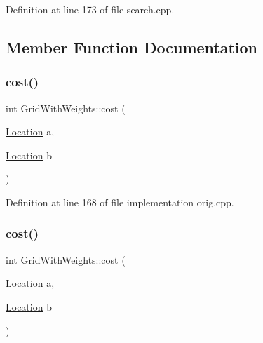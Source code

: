 Definition at line 173 of file search.\+cpp.



\subsection{Member Function Documentation}
\mbox{\label{struct_grid_with_weights_a999c39922a9b507e4436b817592a7ff9}} 
\subsubsection{\texorpdfstring{cost()}{cost()}\hspace{0.1cm}{\footnotesize\ttfamily [1/2]}}
{\footnotesize\ttfamily int Grid\+With\+Weights\+::cost (\begin{DoxyParamCaption}\item[{\mbox{\hyperlink{struct_square_grid_a2c9a2cbd3912aa48ac97289abc3f1c0f}{Location}}}]{a,  }\item[{\mbox{\hyperlink{struct_square_grid_a2c9a2cbd3912aa48ac97289abc3f1c0f}{Location}}}]{b }\end{DoxyParamCaption})\hspace{0.3cm}{\ttfamily [inline]}}



Definition at line 168 of file implementation orig.\+cpp.

\mbox{\label{struct_grid_with_weights_a999c39922a9b507e4436b817592a7ff9}} 
\subsubsection{\texorpdfstring{cost()}{cost()}\hspace{0.1cm}{\footnotesize\ttfamily [2/2]}}
{\footnotesize\ttfamily int Grid\+With\+Weights\+::cost (\begin{DoxyParamCaption}\item[{\mbox{\hyperlink{struct_square_grid_a2c9a2cbd3912aa48ac97289abc3f1c0f}{Location}}}]{a,  }\item[{\mbox{\hyperlink{struct_square_grid_a2c9a2cbd3912aa48ac97289abc3f1c0f}{Location}}}]{b }\end{DoxyParamCaption})\hspace{0.3cm}{\ttfamily [inline]}}




